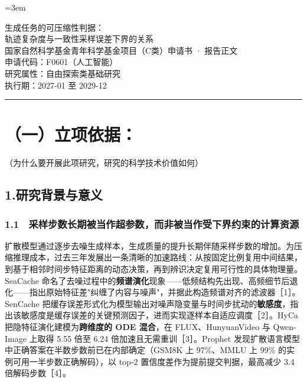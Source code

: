 \documentclass[12pt,a4paper]{ctexart}
\begin{document}
\sloppy
\emergencystretch=3em

\begin{center}
  {\heiti{} 生成任务的可压缩性判据：\\[6pt] 轨迹复杂度与一致性采样误差下界的关系}\\[14pt]
  {\heiti{} 国家自然科学基金青年科学基金项目（C类）申请书 · 报告正文}\\[10pt]
  {\songti{}
申请代码：F0601（人工智能）\\[3pt]
    研究属性：自由探索类基础研究\\[3pt]
    执行期：2027-01 至 2029-12
  }
\end{center}
\vspace{6pt}
\noindent\rule{\linewidth}{0.8pt}

\section*{（一）立项依据：}

（为什么要开展此项研究，研究的科学技术价值如何）

\subsection*{1.研究背景与意义}

\subsubsection*{1.1　采样步数长期被当作超参数，而非被当作受下界约束的计算资源}

扩散模型通过逐步去噪生成样本，生成质量的提升长期伴随采样步数的增加。为压缩推理成本，过去三年发展出一条清晰的加速路线：从按固定比例复用中间结果，到基于相邻时间步特征距离的动态决策，再到辨识决定复用可行性的具体物理量。SeaCache 命名了去噪过程中的\textbf{频谱演化}现象——低频结构先出现、高频细节后退化——指出原始特征差"纠缠了内容与噪声"，并据此构造频谱对齐的滤波器［1］。SenCache 把缓存误差形式化为模型输出对噪声隐变量与时间步扰动的\textbf{敏感度}，指出该敏感度是缓存误差的关键预测因子，进而实现逐样本自适应调度［2］。HyCa 把隐特征演化建模为\textbf{跨维度的 ODE 混合}，在 FLUX、HunyuanVideo 与 Qwen-Image 上取得 5.55 倍至 6.24 倍加速且无需重训［3］。Prophet 发现扩散语言模型中正确答案在半数步数前已在内部确定（GSM8K 上 97\%、MMLU 上 99\% 的实例可用一半步数正确解码），以 top-2 置信度差作为提前提交判据，最高减少 3.4 倍解码步数［4］。
\end{document}
